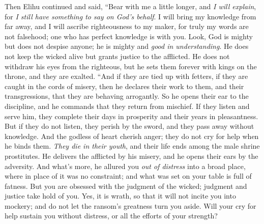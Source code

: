 \begin{biblechapter} %
 Then Elihu continued and said,
\verse “Bear with me a little longer, and \textit{I will explain}, 
for \textit{I still have something to say on God’s behalf}.
\verse I will bring my knowledge from far away, 
and I will ascribe righteousness to my maker,
\verse for truly my words are not falsehood; 
one who has perfect knowledge is with you.
\verse Look, God is mighty but does not despise anyone; 
he is mighty and \textit{good in understanding}.
\verse He does not keep the wicked alive 
but grants justice to the afflicted.
\verse He does not withdraw his eyes from the righteous, 
but he sets them forever with kings on the throne, and they are exalted.
\verse “And if they are tied up with fetters, 
if they are caught in the cords of misery,
\verse then he declares their work to them, 
and their transgressions, that they are behaving arrogantly.
\verse So he opens their ear to the discipline, 
and he commands that they return from mischief.
\verse If they listen and serve him, 
they complete their days in prosperity and their years in pleasantness.
\verse But if they do not listen, they perish by the sword, 
and they pass away without knowledge.
\verse And the godless of heart cherish anger; 
they do not cry for help when he binds them.
\verse \textit{They die in their youth}, 
and their life ends among the male shrine prostitutes.
\verse He delivers the afflicted by his misery, 
and he opens their ears by the adversity.
\verse And what’s more, he allured you \textit{out of distress} 
into a broad place, where in place of it was no constraint; 
and what was set on your table is full of fatness.
\verse But you are obsessed with the judgment of the wicked; 
judgment and justice take hold of you.
\verse Yes, it is wrath, so that it will not incite you into mockery; 
and do not let the ransom’s greatness turn you aside.
\verse Will your cry for help sustain you without distress, 
or all the efforts of your strength?

\end{biblechapter}
